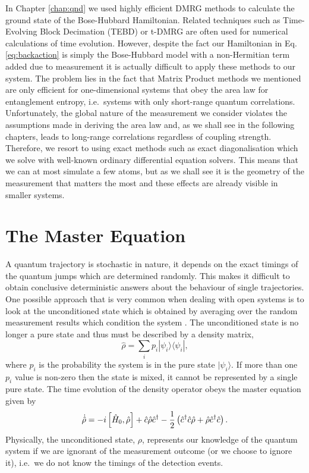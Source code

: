 In Chapter \ref{chap:qnd} we used highly efficient DMRG methods
\cite{tnt} to calculate the ground state of the Bose-Hubbard
Hamiltonian. Related techniques such as Time-Evolving Block Decimation
(TEBD) or t-DMRG are often used for numerical calculations of time
evolution. However, despite the fact our Hamiltonian in
Eq. \eqref{eq:backaction} is simply the Bose-Hubbard model with a
non-Hermitian term added due to measurement it is actually difficult
to apply these methods to our system. The problem lies in the fact
that Matrix Product methods we mentioned are only efficient for
one-dimensional systems that obey the area law for entanglement
entropy, i.e.~systems with only short-range quantum
correlations. Unfortunately, the global nature of the measurement we
consider violates the assumptions made in deriving the area law and,
as we shall see in the following chapters, leads to long-range
correlations regardless of coupling strength. Therefore, we resort to
using exact methods such as exact diagonalisation which we solve with
well-known ordinary differential equation solvers. This means that we
can at most simulate a few atoms, but as we shall see it is the
geometry of the measurement that matters the most and these effects
are already visible in smaller systems.

\section{The Master Equation}
\label{sec:master}

A quantum trajectory is stochastic in nature, it depends on the exact
timings of the quantum jumps which are determined randomly. This makes
it difficult to obtain conclusive deterministic answers about the
behaviour of single trajectories. One possible approach that is very
common when dealing with open systems is to look at the unconditioned
state which is obtained by averaging over the random measurement
results which condition the system \cite{MeasurementControl}. The
unconditioned state is no longer a pure state and thus must be
described by a density matrix,
\begin{equation}
  \label{eq:rho}
  \hat{\rho} = \sum_i p_i | \psi_i \rangle \langle \psi_i |,
\end{equation}
where $p_i$ is the probability the system is in the pure state
$| \psi_i \rangle$. If more than one $p_i$ value is non-zero then the
state is mixed, it cannot be represented by a single pure state. The
time evolution of the density operator obeys the master equation given
by
\begin{equation}
  \dot{\hat{\rho}} = -i \left[ \hat{H}_0, \hat{\rho} \right] + \hat{c}
  \hat{\rho} \hat{c}^\dagger - \frac{1}{2} \left( \hat{c}^\dagger \hat{c} \hat{\rho} + \hat{\rho}
    \hat{c}^\dagger \hat{c} \right).
\end{equation}
Physically, the unconditioned state, $\rho$, represents our knowledge
of the quantum system if we are ignorant of the measurement outcome
(or we choose to ignore it), i.e.~we do not know the timings of the
detection events. 

